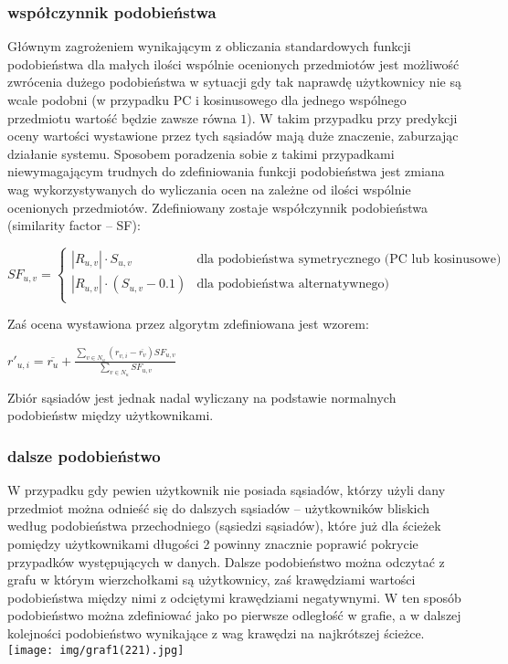 \documentclass{pracamgr}
\begin{document}
    \subsubsection{współczynnik podobieństwa}
     Głównym zagrożeniem wynikającym z obliczania standardowych funkcji podobieństwa dla małych ilości wspólnie ocenionych przedmiotów jest możliwość
     zwrócenia dużego podobieństwa w sytuacji gdy tak naprawdę użytkownicy nie są wcale podobni
     (w przypadku PC i kosinusowego dla jednego wspólnego przedmiotu wartość będzie zawsze równa $1$).
     W takim przypadku przy predykcji oceny wartości wystawione przez tych sąsiadów mają duże znaczenie, zaburzając działanie systemu.
     Sposobem poradzenia sobie z takimi przypadkami niewymagającym trudnych do zdefiniowania funkcji podobieństwa jest zmiana wag
     wykorzystywanych do wyliczania ocen na zależne od ilości wspólnie ocenionych przedmiotów.
     Zdefiniowany zostaje współczynnik podobieństwa (similarity factor -- SF):
     \begin{center}
      $SF_{u,v}=\left\{\begin{array}{cc}
       |R_{u,v}|\cdot S_{u,v}&\text{dla podobieństwa symetrycznego (PC lub kosinusowe)}\\
       |R_{u,v}|\cdot(S_{u,v}-0.1)&\text{dla podobieństwa alternatywnego)}\\
      \end{array}\right.$
     \end{center}
     Zaś ocena wystawiona przez algorytm zdefiniowana jest wzorem:
     \begin{center}
     $r'_{u,i}=\overline{r_{u}}+\frac{\sum\limits_{v\in N_u}(r_{v,i}-\overline{r_v})SF_{u,v}}{\sum\limits_{v\in N_u}SF_{u,v}}$
     \end{center}
     Zbiór sąsiadów jest jednak nadal wyliczany na podstawie normalnych podobieństw między użytkownikami.
    \subsubsection{dalsze podobieństwo}
     W przypadku gdy pewien użytkownik nie posiada sąsiadów, którzy użyli dany przedmiot
     można odnieść się do dalszych sąsiadów -- użytkowników bliskich według podobieństwa przechodniego (sąsiedzi sąsiadów),
     które już dla ścieżek pomiędzy użytkownikami długości 2 powinny znacznie poprawić pokrycie przypadków występujących w danych.
     Dalsze podobieństwo można odczytać z grafu w którym wierzchołkami są użytkownicy, zaś krawędziami wartości podobieństwa między nimi z odciętymi krawędziami
     negatywnymi. W ten sposób podobieństwo można zdefiniować jako po pierwsze odległość w grafie, a w dalszej kolejności podobieństwo wynikające z wag krawędzi
     na najkrótszej ścieżce.\newline
     \texttt{[image: img/graf1(221).jpg]}\newline
\end{document}
